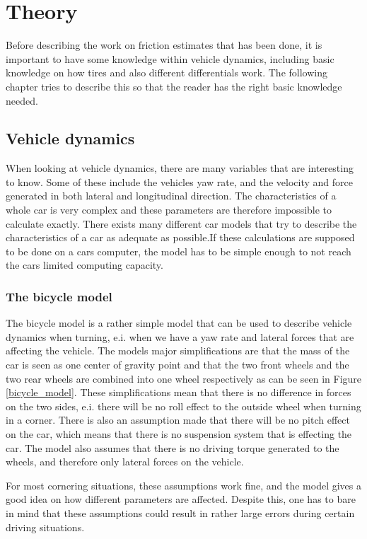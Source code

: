 \chapter{Theory}

Before describing the work on friction estimates that has been done, it is important to have some knowledge within vehicle dynamics, including basic knowledge on how tires and also different differentials work. The following chapter tries to describe this so that the reader has the right basic knowledge needed.

\section{Vehicle dynamics}

When looking at vehicle dynamics, there are many variables that are interesting to know. Some of these include the vehicles yaw rate, and the velocity and force generated in both lateral and longitudinal direction. The characteristics of a whole car is very complex and these parameters are therefore impossible to calculate exactly. There exists many different car models that try to describe the characteristics of a car as adequate as possible.If these calculations are supposed to be done on a cars computer, the model has to be simple enough to not reach the cars limited computing capacity.

\subsection{The bicycle model}

The bicycle model is a rather simple model that can be used to describe vehicle dynamics when turning, e.i. when we have a yaw rate and lateral forces that are affecting the vehicle. The models major simplifications are that the mass of the car is seen as one center of gravity point and that the two front wheels and the two rear wheels are combined into one wheel respectively as can be seen in Figure \ref{bicycle_model}. These simplifications mean that there is no difference in forces on the two sides, e.i. there will be no roll effect to the outside wheel when turning in a corner. There is also an assumption made that there will be no pitch effect on the car, which means that there is no suspension system that is effecting the car. The model also assumes that there is no driving torque generated to the wheels, and therefore only lateral forces on the vehicle.

For most cornering situations, these assumptions work fine, and the model gives a good idea on how different parameters are affected. Despite this, one has to bare in mind that these assumptions could result in rather large errors during certain driving situations.

